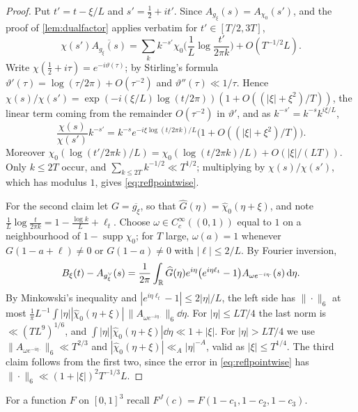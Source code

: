 \documentclass[11pt,colorlinks]{charlie}
\begin{document}
\begin{proof}
Put $t'=t-\xi/L$ and $s'=\frac12+it'$. Since $A_{g_\xi}(s)=A_{\chi_0}(s')$, and the proof of \cref{lem:dualfactor} applies verbatim for $t'\in[T/2,3T]$,
\[
 \chi(s')\overline{A_{g_\xi}(s)}=\sum_kk^{-s'}\chi_0\Big(\frac1L\log\frac{t'}{2\pi k}\Big)+O(T^{-1/2}L).
\]
Write $\chi(\frac12+i\tau)=e^{-i\vartheta(\tau)}$; by Stirling's formula $\vartheta'(\tau)=\log(\tau/2\pi)+O(\tau^{-2})$ and $\vartheta''(\tau)\ll1/\tau$. Hence $\chi(s)/\chi(s')=\exp(-i(\xi/L)\log(t/2\pi))(1+O((|\xi|+\xi^2)/T))$, the linear term coming from the remainder $O(\tau^{-2})$ in $\vartheta'$, and as $k^{-s'}=k^{-s}k^{i\xi/L}$,
\[
 \frac{\chi(s)}{\chi(s')}k^{-s'}=k^{-s}e^{-i\xi\log(t/2\pi k)/L}\big(1+O((|\xi|+\xi^2)/T)\big).
\]
Moreover $\chi_0(\log(t'/2\pi k)/L)=\chi_0(\log(t/2\pi k)/L)+O(|\xi|/(LT))$. Only $k\le2T$ occur, and $\sum_{k\le2T}k^{-1/2}\ll T^{1/2}$; multiplying by $\chi(s)/\chi(s')$, which has modulus $1$, gives \eqref{eq:reflpointwise}.

For the second claim let $G=\overline{g_\xi}$, so that $\widehat G(\eta)=\widehat\chi_0(\eta+\xi)$, and note $\frac1L\log\frac t{2\pi k}=1-\frac{\log k}L+\ell_t$. Choose $\omega\in C_c^\infty((0,1))$ equal to $1$ on a neighbourhood of $1-\operatorname{supp}\chi_0$; for $T$ large, $\omega(a)=1$ whenever $G(1-a+\ell)\ne0$ or $G(1-a)\ne0$ with $|\ell|\le2/L$. By Fourier inversion,
\[
 B_\xi(t)-A_{g_\xi^\vee}(s)=\frac1{2\pi}\int_{\mathbb{R}}\widehat G(\eta)e^{i\eta}\big(e^{i\eta\ell_t}-1\big)A_{\omega e^{-i\eta\cdot}}(s)\,\mathrm{d}\eta .
\]
By Minkowski's inequality and $|e^{i\eta\ell_t}-1|\le2|\eta|/L$, the left side has $\|\cdot\|_6$ at most $\frac1\pi L^{-1}\int|\eta||\widehat\chi_0(\eta+\xi)|\,\|A_{\omega e^{-i\eta\cdot}}\|_6\dd\eta$. For $|\eta|\le LT/4$ the last norm is $\ll(TL^9)^{1/6}$, and $\int|\eta||\widehat\chi_0(\eta+\xi)|\dd\eta\ll1+|\xi|$. For $|\eta|>LT/4$ we use $\|A_{\omega e^{-i\eta\cdot}}\|_6\ll T^{2/3}$ and $|\widehat\chi_0(\eta+\xi)|\ll_A|\eta|^{-A}$, valid as $|\xi|\le T^{1/4}$. The third claim follows from the first two, since the error in \eqref{eq:reflpointwise} has $\|\cdot\|_6\ll(1+|\xi|)^2T^{-1/3}L$.
\end{proof}

For a function $F$ on $[0,1]^3$ recall $F^J(c)=F(1-c_1,1-c_2,1-c_3)$.
\end{document}
